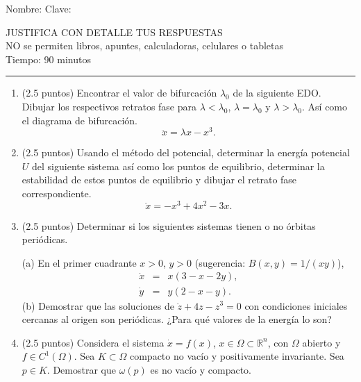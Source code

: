 \documentclass[11pt]{article}
\begin{document}
\vspace{0.6cm}
Nombre: \underline{\hspace{9cm}} \quad Clave: \underline{\hspace{3cm}}

\vspace{0.5cm}
\begin{center}
JUSTIFICA CON DETALLE TUS RESPUESTAS\\
NO se permiten libros, apuntes, calculadoras, celulares o tabletas\\
Tiempo: 90 minutos
\end{center}
\vspace{-0.2cm}
\rule{\textwidth}{0.4pt}
\vspace{0.2cm}

\begin{enumerate}
\item (2.5 puntos) Encontrar el valor de bifurcación $\lambda_0$ de la siguiente EDO. Dibujar los respectivos retratos fase para $\lambda<\lambda_0$, $\lambda=\lambda_0$ y $\lambda>\lambda_0$. Así como el diagrama de bifurcación.
$$\ddot x=\lambda x-x^3.$$
\vspace{0.15cm}

\item (2.5 puntos) Usando el método del potencial, determinar la energía potencial $U$ del siguiente sistema así como los puntos de equilibrio, determinar la estabilidad de estos puntos de equilibrio y dibujar el retrato fase correspondiente.
$$\ddot x=-x^3+4x^2-3x.$$
\vspace{0.15cm}

\item (2.5 puntos) Determinar si los siguientes sistemas tienen o no órbitas periódicas.

(a) En el primer cuadrante $x>0$, $y>0$ (sugerencia: $B(x,y)=1/(xy)$),
\begin{eqnarray*}
\dot x &=& x(3-x-2y), \\
\dot y &=& y(2-x-y).
\end{eqnarray*}
(b) Demostrar que las soluciones de $\ddot z+4z-z^3=0$ con condiciones iniciales cercanas al origen son periódicas. ¿Para qué valores de la energía lo son?
\vspace{0.15cm}

\item (2.5 puntos) Considera el sistema $\dot x=f(x)$, $x\in\Omega\subset\mathbb{R}^n$, con $\Omega$ abierto y $f\in C^1(\Omega)$. Sea $K\subset\Omega$ compacto no vacío y positivamente invariante. Sea $p\in K$. Demostrar que $\omega(p)$ es no vacío y compacto.
\vspace{0.15cm}

\end{enumerate}
\end{document}

